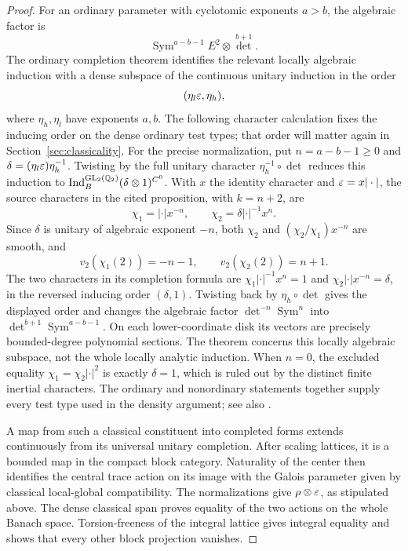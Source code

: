 \begin{proof}
For an ordinary parameter with cyclotomic exponents
\(a>b\), the algebraic factor is
\[
 \operatorname{Sym}^{a-b-1} E^2\otimes\det^{b+1}.
\]
The ordinary completion theorem
\cite[Proposition~2.2.1]{BreuilEmerton2010} identifies the
relevant locally algebraic induction with a dense
subspace of the continuous unitary induction in the order
\[
 (\eta_l\varepsilon,\eta_h),
\]
where \(\eta_h,\eta_l\) have exponents \(a,b\).
The following character calculation fixes the inducing order on the
dense ordinary test types; that order will matter again in
Section~\ref{sec:classicality}. For the precise normalization, put \(n=a-b-1\geq0\) and
\(\delta=(\eta_l\varepsilon)\eta_h^{-1}\). Twisting by the full
unitary character \(\eta_h^{-1}\circ\det\) reduces this
induction to \(\operatorname{Ind}_B^{\operatorname{GL}_2(\mathbb Q_2)}(\delta\otimes1)^{C^0}\).
With \(x\) the identity character and \(\varepsilon=x|\cdot|\),
the source characters in the cited proposition, with \(k=n+2\), are
\[
 \chi_1=|\cdot|x^{-n},\qquad
 \chi_2=\delta|\cdot|^{-1}x^n.
\]
Since \(\delta\) is unitary of algebraic exponent \(-n\),
both \(\chi_2\) and \((\chi_2/\chi_1)x^{-n}\) are smooth, and
\[
 v_2(\chi_1(2))=-n-1,\qquad
 v_2(\chi_2(2))=n+1.
\]
The two characters in its completion formula are
\(\chi_1|\cdot|^{-1}x^n=1\) and
\(\chi_2|\cdot|x^{-n}=\delta\), in the reversed inducing
order \((\delta,1)\). Twisting back by
\(\eta_h\circ\det\) gives the displayed order and changes
the algebraic factor \(\det^{-n}\operatorname{Sym}^n\) into
\(\det^{b+1}\operatorname{Sym}^{a-b-1}\).
On each lower-coordinate disk its vectors are precisely
bounded-degree polynomial sections. The theorem concerns this
locally algebraic subspace, not the whole locally analytic induction.
When \(n=0\), the excluded equality
\(\chi_1=\chi_2|\cdot|^2\) is exactly \(\delta=1\),
which is ruled out by the distinct finite inertial characters.
The ordinary and nonordinary statements together supply
every test type used in the density argument; see also
\cite[Propositions~5.3--5.6]{PaskunasTung2021}.

A map from such a classical constituent into completed
forms extends continuously from its universal unitary
completion. After scaling lattices, it is a bounded map
in the compact block category. Naturality of the center
then identifies the central trace action on its image
with the Galois parameter given by classical
local-global compatibility. The normalizations give
\(\rho\otimes\varepsilon\), as stipulated above.
The dense classical span proves equality of the two
actions on the whole Banach space. Torsion-freeness of
the integral lattice gives integral equality and shows
that every other block projection vanishes.


\end{proof}

